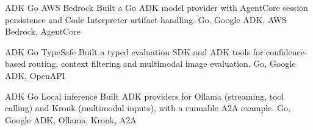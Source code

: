 %
%
%


\begin{projects}
	\project
	{ADK Go \textperiodcentered{} AWS Bedrock}{}
	{}
	{Built a Go ADK model provider with AgentCore session persistence and Code Interpreter artifact handling.}
	{Go, Google ADK, AWS Bedrock, AgentCore}

	\project
	{ADK Go \textperiodcentered{} TypeSafe}{}
	{}
	{Built a typed evaluation SDK and ADK tools for confidence-based routing, context filtering and multimodal image evaluation.}
	{Go, Google ADK, OpenAPI}

	\project
	{ADK Go \textperiodcentered{} Local inference}{}
	{
	 }
	{Built ADK providers for Ollama (streaming, tool calling) and Kronk (multimodal inputs), with a runnable A2A example.}
	{Go, Google ADK, Ollama, Kronk, A2A}
\end{projects}
